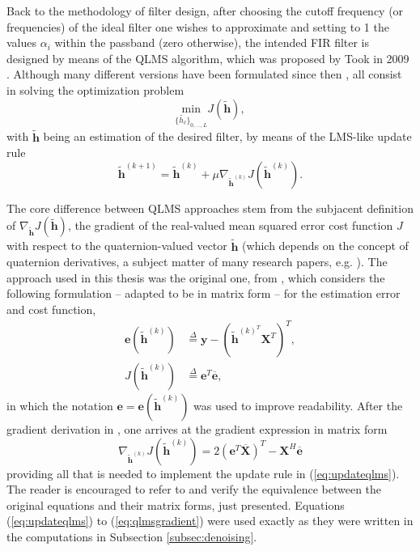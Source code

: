 Back to the methodology of filter design, after choosing the cutoff frequency (or frequencies) of the ideal filter one wishes to approximate and setting to 1 the values $\alpha_i$ within the passband (zero otherwise),
the intended FIR filter is designed by means of the QLMS algorithm, which was proposed by Took in 2009 \parencite{took2008quaternion}. Although many different versions have been formulated since then \parencite{ogunfunmi2015adaptive, almeida2014low, ortolani2016quaternion}, all consist in solving the optimization problem
\begin{equation}
    \label{eq:opt}
    \underset{\{\widetilde{h_\ell}\}_{0, \dots, L}}{\text{min}} J(\mathbf{\widetilde{h}}),
\end{equation}
with $\mathbf{\widetilde{h}}$ being an estimation of the desired filter, by means of the LMS-like update rule
\begin{equation}
    \label{eq:updateqlms}
    \mathbf{\widetilde{h}}^{(k+1)} =
    \mathbf{\widetilde{h}}^{(k)} +
    \mu \nabla_{\mathbf{\widetilde{h}}^{(k)}} J(\mathbf{\widetilde{h}}^{(k)}).
\end{equation}

The core difference between QLMS approaches stem from the subjacent definition of $\nabla_{\mathbf{\widetilde{h}}} J(\mathbf{\widetilde{h}})$, the gradient of the real-valued mean squared error cost function $J$ with respect to the quaternion-valued vector $\mathbf{\widetilde{h}}$ (which depends on the concept of quaternion derivatives, a subject matter of many research papers, e.g. \parencite{xu2015enabling,jahanchahi2012gradient}). The approach used in this thesis was the original one, from \parencite{took2008quaternion}, which considers the following formulation -- adapted to be in matrix form -- for the estimation error and cost function,
\begin{align}
    \label{eq:errorqlms}
    \mathbf{e}(\mathbf{\widetilde{h}}^{(k)}) & \overset{\Delta}{=}
    \mathbf{y} -
    \left( \mathbf{\widetilde{h}}^{{(k)}^T} \mathbf{X}^T \right)^T, \\
    J(\mathbf{\widetilde{h}}^{(k)})          & \overset{\Delta}{=}
    \mathbf{e}^T
    \overline{\mathbf{e}},
\end{align}
in which the notation $\mathbf{e} = \mathbf{e}(\mathbf{\widetilde{h}}^{(k)})$ was used to improve readability. After the gradient derivation in \parencite{took2008quaternion}, one arrives at the gradient expression in matrix form
\begin{equation}
    \label{eq:qlmsgradient}
    \nabla_{\mathbf{\widetilde{h}}^{(k)}} J(\mathbf{\widetilde{h}}^{(k)}) =
    2 \left(
    \mathbf{e}^T \overline{\mathbf{X}}
    \right)^T - \mathbf{X}^H \overline{\mathbf{e}}
\end{equation}
providing all that is needed to implement the update rule in (\ref{eq:updateqlms}). The reader is encouraged to refer to \parencite{took2008quaternion} and verify the equivalence between the original equations and their matrix forms, just presented. Equations (\ref{eq:updateqlms}) to (\ref{eq:qlmsgradient}) were used exactly as they were written in the computations in Subsection \ref{subsec:denoising}.

